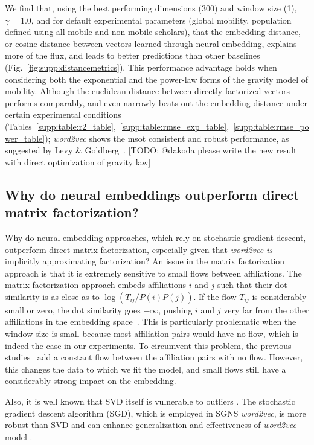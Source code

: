 \documentclass[12pt,a4paper]{article}
\newcommand{\todo}[1]{{\leavevmode\color{orange}[TODO: #1]}}
\begin{document}
We find that, using the best performing dimensions (300) and window size (1),  $\gamma = 1.0$, and for default experimental parameters (global mobility, population defined using all mobile and non-mobile scholars), that the embedding distance, or cosine distance between vectors learned through neural embedding, explains more of the flux, and leads to better predictions than other baselines (Fig.~\ref{fig:supp:distancemetrics}).
This performance advantage holds when considering both the exponential and the power-law forms of the gravity model of mobility.
Although the euclidean distance between directly-factorized vectors performs comparably, and even narrowly beats out the embedding distance under certain experimental conditions (Tables~\ref{supp:table:r2_table},~\ref{supp:table:rmse_exp_table},~\ref{supp:table:rmse_power_table}); \textit{word2vec} shows the msot consistent and robust performance, as suggested by Levy \& Goldberg~\autocite{levy2014neural}. 
\todo{@dakoda please write the new result with direct optimization of gravity law}

\subsection{Why do neural embeddings outperform direct matrix factorization?}
Why do neural-embedding approaches, which rely on stochastic gradient descent, outperform direct matrix factorization, especially given that \textit{word2vec} \emph{is} implicitly approximating factorization?
An issue in the matrix factorization approach is that it is extremely sensitive to small flows between affiliations. The matrix factorization approach embeds affiliations $i$ and $j$ such that their dot similarity is as close as to $\log (T_{ij} / P(i) P(j))$. If the flow $T_{ij}$ is considerably small or zero, the dot similarity goes $-\infty$, pushing $i$ and $j$ very far from the other affiliations in the embedding space~\autocite{levy2014neural, Qui2018}. This is particularly problematic when the window size is small because most affiliation pairs would have no flow, which is indeed the case in our experiments. To circumvent this problem, the previous studies~\autocite{levy2014neural, Qui2018} add a constant flow between the affiliation pairs with no flow. However, this changes the data to which we fit the model, and small flows still have a considerably strong impact on the embedding.

Also, it is well known that SVD itself is vulnerable to outliers \autocite{xu2012robust, huber1981robust, xu1995robust, chandrasekaran2011rank, candes2011robust}.
The stochastic gradient descent algorithm (SGD), which is employed in SGNS \textit{word2vec}, is more robust than SVD and can enhance generalization and effectiveness of {\it word2vec} model \autocite{ma2018power, smith2020generalization, zhang2019algorithmic}.
\end{document}
